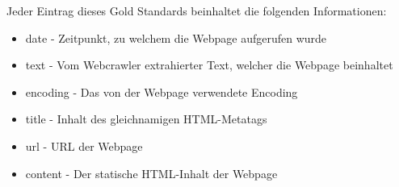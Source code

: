 Jeder Eintrag dieses Gold Standards beinhaltet die folgenden Informationen:
\begin{itemize}
	\item \glqq date\grqq{} - Zeitpunkt, zu welchem die Webpage aufgerufen wurde
	\item \glqq text\grqq{} - Vom Webcrawler extrahierter Text, welcher die Webpage beinhaltet
	\item \glqq encoding\grqq{} - Das von der Webpage verwendete Encoding
	\item \glqq title\grqq{} - Inhalt des gleichnamigen HTML-Metatags
	\item \glqq url\grqq{} - URL der Webpage
	\item \glqq content\grqq{} - Der statische HTML-Inhalt der Webpage	
\end{itemize}


